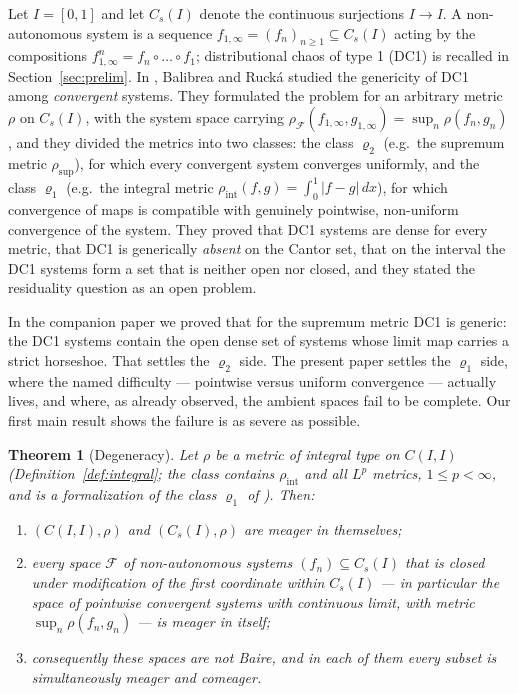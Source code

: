 \documentclass[11pt]{article}
\newtheorem{theorem}{Theorem}[section]
\newcommand{\I}{I}
\newcommand{\Cs}{C_s(\I)}
\newcommand{\CI}{C(\I,\I)}
\newcommand{\rint}{\rho_{\mathrm{int}}}
\newcommand{\rsup}{\rho_{\sup}}
\begin{document}
Let $\I=[0,1]$ and let $\Cs$ denote the continuous surjections $\I\to\I$.  A
non-autonomous system is a sequence $f_{1,\infty}=(f_n)_{n\ge1}\subseteq\Cs$ acting
by the compositions $f^n_{1,\infty}=f_n\circ\dots\circ f_1$; distributional chaos of
type 1 (DC1) is recalled in Section~\ref{sec:prelim}.  In \cite{BR}, Balibrea and
Ruck\'a studied the genericity of DC1 among \emph{convergent} systems.  They
formulated the problem for an arbitrary metric $\rho$ on $\Cs$, with the system
space carrying $\rho_{\mathcal F}(f_{1,\infty},g_{1,\infty})=\sup_n\rho(f_n,g_n)$,
and they divided the metrics into two classes: the class $\varrho_2$ (e.g.\ the
supremum metric $\rsup$), for which every convergent system converges uniformly,
and the class $\varrho_1$ (e.g.\ the integral metric
$\rint(f,g)=\int_0^1|f-g|\,dx$), for which convergence of maps is compatible with
genuinely pointwise, non-uniform convergence of the system.  They proved that DC1
systems are dense for every metric, that DC1 is generically \emph{absent} on the
Cantor set, that on the interval the DC1 systems form a set that is neither open
nor closed, and they stated the residuality question as an open problem.

In the companion paper \cite{companion} we proved that for the supremum metric DC1
is generic: the DC1 systems contain the open dense set of systems whose limit map
carries a strict horseshoe.  That settles the $\varrho_2$ side.  The present paper
settles the $\varrho_1$ side, where the named difficulty --- pointwise versus
uniform convergence --- actually lives, and where, as \cite{BR} already observed,
the ambient spaces fail to be complete.  Our first main result shows the failure is
as severe as possible.

\begin{theorem}[Degeneracy]\label{thm:meager}
Let $\rho$ be a metric of integral type on $\CI$ (Definition~\ref{def:integral};
the class contains $\rint$ and all $L^p$ metrics, $1\le p<\infty$, and is a
formalization of the class $\varrho_1$ of \cite{BR}).  Then:
\begin{enumerate}
\item[(i)] $(\CI,\rho)$ and $(\Cs,\rho)$ are meager in themselves;
\item[(ii)] every space $\mathcal F$ of non-autonomous systems
$(f_n)\subseteq\Cs$ that is closed under modification of the first coordinate
within $\Cs$ --- in particular the space of pointwise convergent systems with
continuous limit, with metric $\sup_n\rho(f_n,g_n)$ --- is meager in itself;
\item[(iii)] consequently these spaces are not Baire, and in each of them
\emph{every} subset is simultaneously meager and comeager.
\end{enumerate}
\end{theorem}
\end{document}
